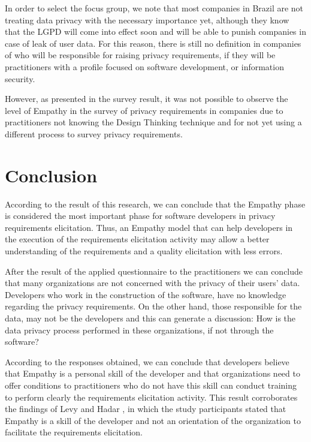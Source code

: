\documentclass[conference]{IEEEtran}
\begin{document}
In order to select the focus group, we note that most companies in Brazil are not treating data privacy with the necessary importance yet, although they know that the LGPD will come into effect soon and will be able to punish companies in case of leak of user data. For this reason, there is still no definition in companies of who will be responsible for raising privacy requirements, if they will be practitioners with a profile focused on software development, or information security.


However, as presented in the survey result, it was not possible to observe the level of Empathy in the survey of privacy requirements in companies due to practitioners not knowing the Design Thinking technique and for not yet using a different process to survey privacy requirements.

\section{Conclusion}
\label{conclusion}

According to the result of this research, we can conclude that the Empathy phase is considered the most important phase for software developers in privacy requirements elicitation. Thus, an Empathy model that can help developers in the execution of the requirements elicitation activity may allow a better understanding of the requirements and a quality elicitation with less errors.

After the result of the applied questionnaire to the practitioners we can conclude that many organizations are not concerned with the privacy of their users' data. Developers who work in the construction of the software, have no knowledge regarding the privacy requirements. On the other hand, those responsible for the data, may not be the developers and this can generate a discussion: How is the data privacy process performed in these organizations, if not through the software?

According to the responses obtained, we can conclude that developers believe that Empathy is a personal skill of the developer and that organizations need to offer conditions to practitioners who do not have this skill can conduct training to perform clearly the requirements elicitation activity. This result corroborates the findings of Levy and Hadar \cite{DBLP:conf/re/LevyH18}, in which the study participants stated that Empathy is a skill of the developer and not an orientation of the organization to facilitate the requirements elicitation.
\end{document}

